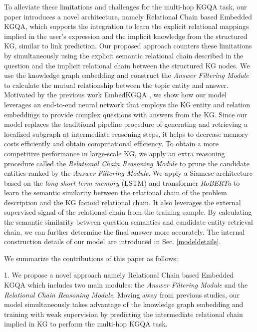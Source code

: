 \documentclass[pdflatex,sn-mathphys]{sn-jnl}%
\theoremstyle{thmstyleone}%
\theoremstyle{thmstyletwo}%
\theoremstyle{thmstylethree}%
\begin{document}
To alleviate these limitations and challenges for the multi-hop KGQA task, our paper introduces a novel architecture, namely Relational Chain based Embedded KGQA, which supports the integration to learn the explicit relational mappings implied in the user's expression and the implicit knowledge from the structured KG, similar to link prediction. Our proposed approach counters these limitations by simultaneously using the explicit semantic relational chain described in the question and the implicit relational chain between the structured KG nodes. We use the knowledge graph embedding and construct the \textit{Answer Filtering Module} to calculate the mutual relationship between the topic entity and answer.
Motivated by the previous work EmbedKGQA \cite{apoorv2020embedKGQA}, we show how our model leverages an end-to-end neural network that employs the KG entity and relation embeddings to provide complex questions with answers from the KG. Since our model replaces the traditional pipeline procedure of generating and retrieving a localized subgraph at intermediate reasoning steps, it helps to decrease memory costs efficiently and obtain computational efficiency. To obtain  a more competitive performance in large-scale KG, we apply an extra reasoning procedure called the \textit{Relational Chain Reasoning Module} to prune the candidate entities ranked by the \textit{Answer Filtering Module}. We apply a Siamese architecture \cite{sia2016jonas} based on the \textit{long short-term memory } (LSTM) and transformer \textit{RoBERTa} \cite{roberta} to learn the semantic similarity between the relational chain of the problem description and the KG factoid relational chain. It also leverages the external supervised signal of the relational chain from the training sample. By calculating the semantic similarity between question semantics and candidate entity retrieval chain, we can further determine the final answer more accurately. The internal construction details of our model are introduced in Sec. \ref{modeldetails}.

We summarize the contributions of this paper as follows:

1. We propose a novel approach namely Relational Chain based Embedded KGQA which includes two main modules: the \textit{Answer Filtering Module} and the \textit{Relational Chain Reasoning Module}. Moving away from previous studies, our model simultaneously takes advantage of the knowledge graph embedding and training with weak supervision by predicting the intermediate relational chain implied in KG to perform the multi-hop KGQA task.
\end{document}
